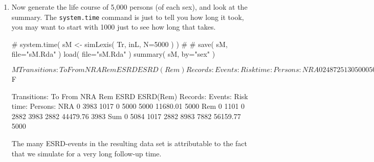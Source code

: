 \begin{enumerate}[resume]
\begin{itemize}
\item The other input for the simulation is the transitions, which is
  a list with an element for each transient state (that is ``NRA'' and
  ``Rem''), each of which is again a list with names equal to the
  states that can be reached from the transient state. The content of
  the list will be \texttt{glm} objects, in this case the models we
  just fitted, describing the transition rates:
\begin{Schunk}
\begin{Sinput}
 Tr <- list( "NRA" = list( "Rem"  = mr,
                           "ESRD" = mx ),
             "Rem" = list( "ESRD(Rem)" = mx ) )
\end{Sinput}
\end{Schunk}
\end{itemize}


\item Now generate the life course of 5,000 persons (of each sex), and look at the summary.
  The \texttt{system.time} command is just to tell you how long it
  took, you may want to start with 1000 just to see how long that takes.
\begin{Schunk}
\begin{Sinput}
 # system.time( sM <- simLexis( Tr, inL, N=5000 ) )
 # 
 # save( sM, file="sM.Rda" )
 load(     file="sM.Rda" )
 summary( sM, by="sex" )
\end{Sinput}
\begin{Soutput}
$M
     
Transitions:
     To
From  NRA  Rem ESRD ESRD(Rem)  Records:  Events: Risk time:  Persons:
  NRA   0 2487 2513         0      5000     5000   19716.34      5000
  Rem   0  635    0      1852      2487     1852   25467.95      2487
  Sum   0 3122 2513      1852      7487     6852   45184.29      5000

$F
     
Transitions:
     To
From  NRA  Rem ESRD ESRD(Rem)  Records:  Events: Risk time:  Persons:
  NRA   0 3983 1017         0      5000     5000   11680.01      5000
  Rem   0 1101    0      2882      3983     2882   44479.76      3983
  Sum   0 5084 1017      2882      8983     7882   56159.77      5000
\end{Soutput}
\end{Schunk}
The many ESRD-events in the resulting data set is attributable to the
fact that we simulate for a very long follow-up time.



\end{enumerate}
